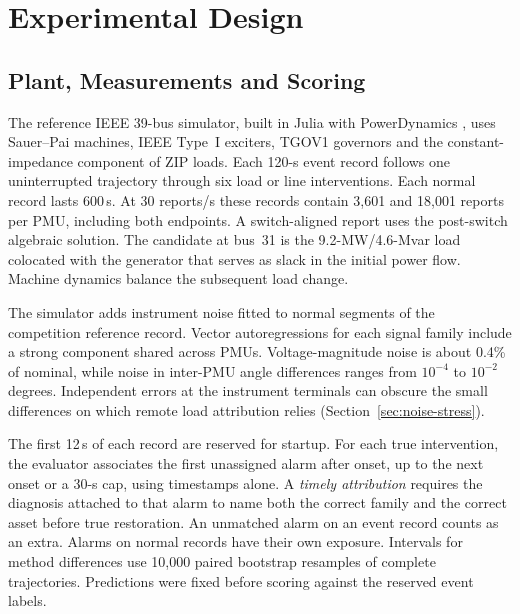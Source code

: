 \section{Experimental Design}
\label{sec:narrative-protocol}

\subsection{Plant, Measurements and Scoring}
The reference IEEE 39-bus simulator, built in Julia with
PowerDynamics \cite{plietzsch2022powerdynamics}, uses Sauer--Pai machines,
IEEE Type~I exciters, TGOV1 governors and the constant-impedance
component of ZIP loads. Each 120-s event record follows one uninterrupted
trajectory through six load or line interventions. Each normal record
lasts 600\,s. At 30 reports/s these records contain 3,601 and 18,001
reports per PMU, including both endpoints. A switch-aligned report uses
the post-switch algebraic solution. The candidate at bus~31 is the
9.2-MW/4.6-Mvar load colocated with the generator that serves as slack
in the initial power flow. Machine dynamics balance the subsequent load change.



The simulator adds instrument noise fitted to normal segments of the
competition reference record. Vector autoregressions for each signal
family include a strong component shared across PMUs. Voltage-magnitude
noise is about 0.4\% of nominal, while noise in inter-PMU angle
differences ranges from $10^{-4}$ to $10^{-2}$ degrees. Independent
errors at the instrument terminals can obscure the small differences on
which remote load attribution relies (Section~\ref{sec:noise-stress}).

The first 12\,s of each record are reserved for startup. For each true
intervention, the evaluator associates the first unassigned alarm after
onset, up to the next onset or a 30-s cap, using timestamps alone. A
\emph{timely attribution} requires the diagnosis attached to that alarm
to name both the correct family and the correct asset before true
restoration. An unmatched alarm on an event record counts as an extra.
Alarms on normal records have their own exposure. Intervals for method
differences use 10,000 paired bootstrap resamples of complete trajectories.
Predictions were fixed before scoring against the reserved event labels.

